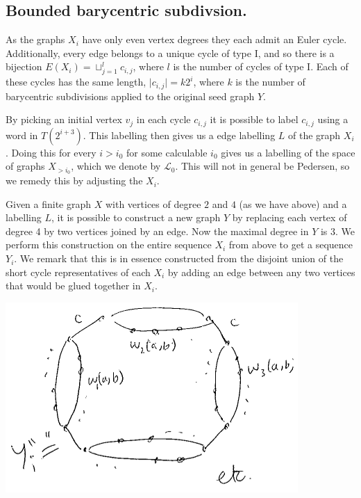 \documentclass[11pt,a4paper]{amsart}
\theoremstyle{plain}
\theoremstyle{definition}%
\theoremstyle{remark}%
\begin{document}
\subsection{Bounded barycentric subdivsion.}

As the graphs $X_{i}$ have only even vertex degrees they each admit an Euler cycle. Additionally, every edge belongs to a unique cycle of type I, and so there is a bijection $E(X_{i}) = \sqcup_{j=1}^{l} c_{i,j}$, where $l$ is the number of cycles of type I. Each of these cycles has the same length, $\vert c_{i,j} \vert = k2^{i}$, where $k$ is the number of barycentric subdivisions applied to the original seed graph $Y$.

By picking an initial vertex $v_{j}$ in each cycle $c_{i,j}$ it is possible to label $c_{i,j}$ using a word in $T(2^{i+3})$. This labelling then gives us a edge labelling $L$ of the graph $X_{i}$. Doing this for every $i>i_{0}$ for some calculable $i_{0}$ gives us a labelling of the space of graphs $X_{>i_{0}}$, which we denote by $\mathcal{L}_{0}$. This will not in general be Pedersen, so we remedy this by adjusting the $X_{i}$.

Given a finite graph $X$ with vertices of degree $2$ and $4$ (as we have above) and a labelling $L$, it is possible to construct a new graph $Y$ by replacing each vertex of degree 4 by two vertices joined by an edge. Now the maximal degree in $Y$ is $3$. We perform this construction on the entire sequence $X_{i}$ from above to get a sequence $Y_{i}$. We remark that this is in essence constructed from the disjoint union of the short cycle representatives of each $X_{i}$ by adding an edge between any two vertices that would be glued together in $X_{i}$. 

\begin{center}
\includegraphics[scale=0.6]{Y.png}
\end{center}
\end{document}
